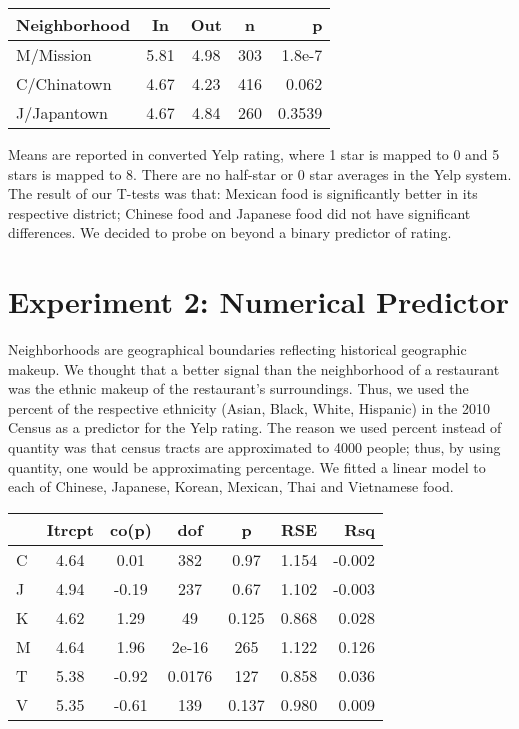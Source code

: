 \documentclass[11pt,twocolumn]{article}
\begin{document}
\begin{center}
  \begin{tabular}{| l | c | c | c | r | }
    \hline
    Neighborhood & In & Out & n & p \\ \hline
    M/Mission & 5.81 & 4.98 & 303 & 1.8e-7 \\ \hline \hline
    C/Chinatown & 4.67 & 4.23 & 416 & 0.062 \\ \hline
    J/Japantown & 4.67 & 4.84 & 260 & 0.3539 \\
    \hline
  \end{tabular}
\end{center}

Means are reported in converted Yelp rating, where 1 star is mapped to 0 and 5 stars is mapped to 8. There are no half-star or 0 star averages in the Yelp system. The result of our T-tests was that: Mexican food is significantly better in its respective district; Chinese food and Japanese food did not have significant differences. We decided to probe on beyond a binary predictor of rating.

\section{Experiment 2: Numerical Predictor}

Neighborhoods are geographical boundaries reflecting historical geographic makeup. We thought that a better signal than the neighborhood of a restaurant was the ethnic makeup of the restaurant's surroundings. Thus, we used the percent of the respective ethnicity (Asian, Black, White, Hispanic) in the 2010 Census as a predictor for the Yelp rating. The reason we used percent instead of quantity was that census tracts are approximated to 4000 people; thus, by using quantity, one would be approximating percentage. We fitted a linear model to each of Chinese, Japanese, Korean, Mexican, Thai and Vietnamese food. 

\begin{center}
  \begin{tabular}{| l | c | c | c | c | c | r | }
    \hline
     & Itrcpt & co(p) & dof & p & RSE & Rsq \\ \hline \hline
    C & 4.64 & 0.01 & 382 & 0.97 & 1.154 & -0.002 \\ \hline
    J & 4.94 & -0.19 & 237 & 0.67 & 1.102 & -0.003 \\ \hline
    K & 4.62 & 1.29 & 49 & 0.125 & 0.868 & 0.028 \\ \hline
    M & 4.64 & 1.96 & 2e-16 & 265 & 1.122 & 0.126 \\ \hline
    T & 5.38 & -0.92 & 0.0176 & 127 & 0.858 & 0.036 \\ \hline
    V & 5.35 & -0.61 & 139 & 0.137 & 0.980 & 0.009 \\
    \hline
  \end{tabular}
\end{center}
\end{document}
